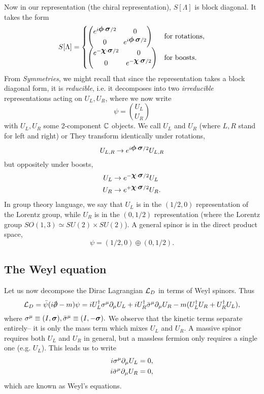Now in our representation (the chiral representation), $S[\Lambda]$ is block diagonal. It takes the form
$$
S[\Lambda]=\begin{cases}
    \begin{pmatrix}
        e^{i\mbox{\boldmath$ \phi $} \cdot \mbox{\boldmath$ \sigma $}/2} & 0\\
        0 & e^{i\mbox{\boldmath$ \phi $} \cdot \mbox{\boldmath$ \sigma $}/2}
    \end{pmatrix}
    & \text{for rotations,}\\
    \begin{pmatrix}
        e^{-\mbox{\boldmath$ \chi $} \cdot \mbox{\boldmath$ \sigma $}/2} & 0\\
        0 & e^{-\mbox{\boldmath$ \chi $} \cdot \mbox{\boldmath$ \sigma $}/2}
    \end{pmatrix}
    & \text{for boosts.}
\end{cases}
$$
From \emph{Symmetries}, we might recall that since the representation takes a block diagonal form, it is \emph{reducible}, i.e. it decomposes into two \emph{irreducible} representations acting on $U_L,U_R$, where we now write
$$\psi={{U_L}\choose{U_R}}$$
with $U_L,U_R$ some 2-component $\mathbb{C}$ objects. We call $U_L$ and $U_R$ (where $L,R$ stand for left and right)  or  They transform identically under rotations,
$$U_{L,R}\to e^{i\mbox{\boldmath$ \phi $} \cdot \mbox{\boldmath$ \sigma $}/2}U_{L,R}$$ but oppositely under boosts,
\begin{align*}
    U_L &\to e^{-\mbox{\boldmath$ \chi $} \cdot \mbox{\boldmath$ \sigma $}/2}U_L\\
    U_R &\to e^{+\mbox{\boldmath$ \chi $} \cdot \mbox{\boldmath$ \sigma $}/2}U_R.
\end{align*}
In group theory language, we say that $U_L$ is in the $(1/2,0)$ representation of the Lorentz group, while $U_R$ is in the $(0,1/2)$ representation (where the Lorentz group $SO(1,3)\simeq SU(2)\times SU(2)$). 
A general spinor is in the direct product space,
$$\psi=(1/2,0)\oplus(0,1/2).$$

\subsection*{The Weyl equation} Let us now decompose the Dirac Lagrangian $\mathcal L_D$ in terms of Weyl spinors. Thus
$$\cL_D=\bar\psi(i\slashed \p -m)\psi =i U_L^\dagger \sigma^\mu \p_\mu U_L + i U_R^\dagger \bar \sigma^\mu \p_\mu U_R - m(U_L^\dagger U_R+U_R^\dagger U_L),$$
where $\sigma^\mu\equiv (I,\mbox{\boldmath$ \sigma $}),\bar \sigma^\mu \equiv (I,-\mbox{\boldmath$ \sigma $}).$ We observe that the kinetic terms separate entirely-- it is only the mass term which mixes $U_L$ and $U_R$. A massive spinor requires both $U_L$ and $U_R$ in general, but a massless fermion only requires a single one (e.g. $U_L$). This leads us to write
\begin{align*}
    i\sigma^\mu \partial_\mu U_L&=0,\\
    i \bar \sigma^\mu \partial_\mu U_R&=0,
\end{align*}
which are known as Weyl's equations.


